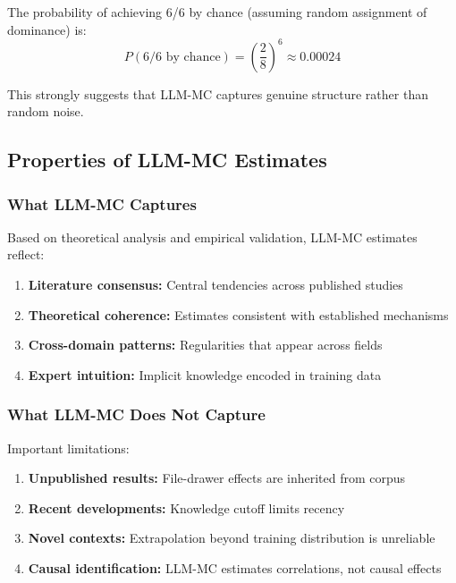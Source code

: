 The probability of achieving 6/6 by chance (assuming random assignment of dominance) is:
\begin{equation}
P(\text{6/6 by chance}) = \left(\frac{2}{8}\right)^6 \approx 0.00024
\end{equation}

This strongly suggests that LLM-MC captures genuine structure rather than random noise.

\subsection{Properties of LLM-MC Estimates}

\subsubsection{What LLM-MC Captures}

Based on theoretical analysis and empirical validation, LLM-MC estimates reflect:

\begin{enumerate}
    \item \textbf{Literature consensus:} Central tendencies across published studies
    \item \textbf{Theoretical coherence:} Estimates consistent with established mechanisms
    \item \textbf{Cross-domain patterns:} Regularities that appear across fields
    \item \textbf{Expert intuition:} Implicit knowledge encoded in training data
\end{enumerate}

\subsubsection{What LLM-MC Does Not Capture}

Important limitations:

\begin{enumerate}
    \item \textbf{Unpublished results:} File-drawer effects are inherited from corpus
    \item \textbf{Recent developments:} Knowledge cutoff limits recency
    \item \textbf{Novel contexts:} Extrapolation beyond training distribution is unreliable
    \item \textbf{Causal identification:} LLM-MC estimates correlations, not causal effects
\end{enumerate}

